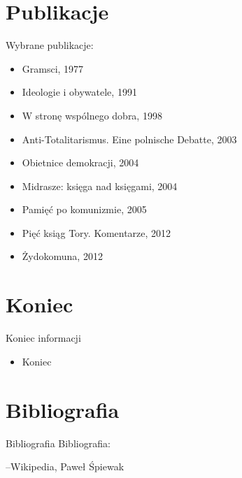 \documentclass{beamer}
\begin{document}
\section{Publikacje}
\begin{frame}{Wybrane publikacje:}
\begin {itemize}
\pause
\item Gramsci, 1977 \pause
\item Ideologie i obywatele, 1991 \pause
\item W stronę wspólnego dobra, 1998 \pause
\item Anti-Totalitarismus. Eine polnische Debatte, 2003 \pause
\item Obietnice demokracji, 2004 \pause
\item Midrasze: księga nad księgami, 2004 \pause
\item Pamięć po komunizmie, 2005 \pause
\item Pięć ksiąg Tory. Komentarze, 2012 \pause
\item Żydokomuna, 2012 
\end {itemize} 
\end {frame}

\section{Koniec}
\begin{frame}{Koniec informacji}
\begin {itemize}
\item Koniec
\end {itemize}
\end {frame}

\section{Bibliografia}
\begin{frame}{Bibliografia}
Bibliografia:
\begin{thebibliography}{9}
--Wikipedia, Paweł Śpiewak
\end{thebibliography}
\end{frame}
\end{document}
